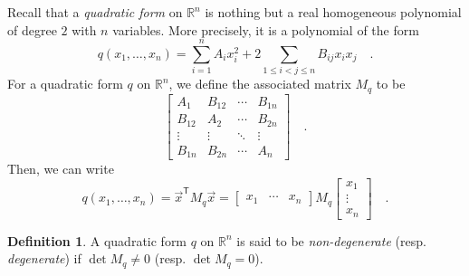 \documentclass[pdftex,a4paper,12pt]{scrartcl}
\theoremstyle{plain}
\theoremstyle{definition}
\newtheorem*{definition}{Definition}
\theoremstyle{remark}
\begin{document}
Recall that a \emph{quadratic form} on $\mathbb R^n$ is nothing but a real homogeneous polynomial of degree $2$ with $n$ variables.
More precisely, it is a polynomial of the form
\begin{equation}
\label{eq:quad-form-alph}
q(x_1,\dots,x_n)
= \sum_{i=1}^n A_ix_i^2+2\sum_{1\le i<j\le n} B_{ij}x_ix_j
\quad.
\end{equation}
For a quadratic form $q$ on $\mathbb R^n$, we define the associated matrix $M_q$ to be
\[
\begin{bmatrix}
A_1 & B_{12} & \cdots & B_{1n} \\
B_{12} & A_2 & \cdots & B_{2n} \\
\vdots & \vdots & \ddots & \vdots \\
B_{1n} & B_{2n} & \cdots & A_n
\end{bmatrix}
\quad.
\]
Then, we can write
\begin{equation}
\label{eq:quad-form-mat}
q(x_1,\dots,x_n)
= \vec x^{\mathsf T} M_q\vec x
=
\begin{bmatrix}
x_1 & \cdots & x_n
\end{bmatrix}
M_q
\begin{bmatrix}
x_1 \\ \vdots \\ x_n
\end{bmatrix}
\quad.
\end{equation}

\begin{definition}
A quadratic form $q$ on $\mathbb R^n$ is said to be \emph{non-degenerate} (resp. \emph{degenerate}) if $\det M_q\neq 0$ (resp. $\det M_q=0$).
\end{definition}
\end{document}
